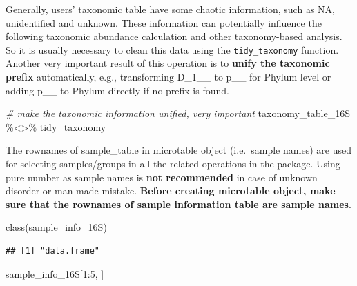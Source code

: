 \documentclass[
]{book}
\newenvironment{Shaded}{\begin{snugshade}}{\end{snugshade}}
\newcommand{\CommentTok}[1]{\textcolor[rgb]{0.56,0.35,0.01}{\textit{#1}}}
\newcommand{\DecValTok}[1]{\textcolor[rgb]{0.00,0.00,0.81}{#1}}
\newcommand{\FunctionTok}[1]{\textcolor[rgb]{0.00,0.00,0.00}{#1}}
\newcommand{\NormalTok}[1]{#1}
\newcommand{\SpecialCharTok}[1]{\textcolor[rgb]{0.00,0.00,0.00}{#1}}
\begin{document}
Generally, users' taxonomic table have some chaotic information, such as NA, unidentified and unknown.
These information can potentially influence the following taxonomic abundance calculation and other taxonomy-based analysis.
So it is usually necessary to clean this data using the \texttt{tidy\_taxonomy} function.
Another very important result of this operation is to \textbf{unify the taxonomic prefix} automatically,
e.g., transforming D\_1\_\_ to p\_\_ for Phylum level or adding p\_\_ to Phylum directly if no prefix is found.

\begin{Shaded}
\begin{Highlighting}[]
\CommentTok{\# make the taxonomic information unified, very important}
\NormalTok{taxonomy\_table\_16S }\SpecialCharTok{\%\textless{}\textgreater{}\%}\NormalTok{ tidy\_taxonomy}
\end{Highlighting}
\end{Shaded}

The rownames of sample\_table in microtable object (i.e.~sample names) are used for selecting samples/groups in all the related operations in the package.
Using pure number as sample names is \textbf{not recommended} in case of unknown disorder or man-made mistake.
\textbf{Before creating microtable object, make sure that the rownames of sample information table are sample names}.

\begin{Shaded}
\begin{Highlighting}[]
\FunctionTok{class}\NormalTok{(sample\_info\_16S)}
\end{Highlighting}
\end{Shaded}

\begin{verbatim}
## [1] "data.frame"
\end{verbatim}

\begin{Shaded}
\begin{Highlighting}[]
\NormalTok{sample\_info\_16S[}\DecValTok{1}\SpecialCharTok{:}\DecValTok{5}\NormalTok{, ]}
\end{Highlighting}
\end{Shaded}
\end{document}
